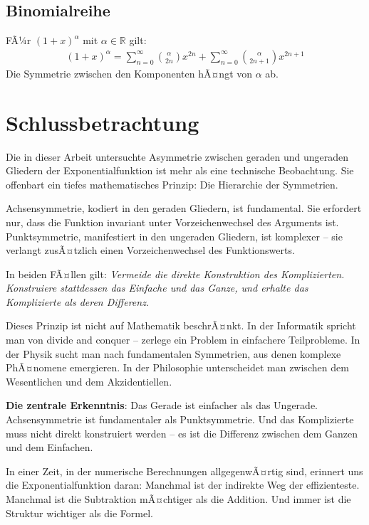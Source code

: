 ﻿\documentclass[a4paper,12pt]{article}
\theoremstyle{definition}
\begin{document}
\subsection{Binomialreihe}

FÃ¼r $(1+x)^\alpha$ mit $\alpha \in \mathbb{R}$ gilt:
\begin{align}
  (1+x)^\alpha
    = \sum_{n=0}^{\infty} \binom{\alpha}{2n} x^{2n}
    + \sum_{n=0}^{\infty} \binom{\alpha}{2n+1} x^{2n+1}
\end{align}
Die Symmetrie zwischen den Komponenten hÃ¤ngt von $\alpha$ ab.

\section{Schlussbetrachtung}

Die in dieser Arbeit untersuchte Asymmetrie zwischen geraden und ungeraden
Gliedern der Exponentialfunktion ist mehr als eine technische Beobachtung.
Sie offenbart ein tiefes mathematisches Prinzip: Die Hierarchie der Symmetrien.

Achsensymmetrie, kodiert in den geraden Gliedern, ist fundamental. Sie
erfordert nur, dass die Funktion invariant unter Vorzeichenwechsel des
Arguments ist. Punktsymmetrie, manifestiert in den ungeraden Gliedern, ist
komplexer -- sie verlangt zusÃ¤tzlich einen Vorzeichenwechsel des Funktionswerts.

In beiden FÃ¤llen gilt: \textit{Vermeide die direkte Konstruktion des
Komplizierten. Konstruiere stattdessen das Einfache und das Ganze, und erhalte
das Komplizierte als deren Differenz.}

Dieses Prinzip ist nicht auf Mathematik beschrÃ¤nkt. In der Informatik spricht
man von \glqq divide and conquer\grqq{} -- zerlege ein Problem in einfachere
Teilprobleme. In der Physik sucht man nach fundamentalen Symmetrien, aus denen
komplexe PhÃ¤nomene emergieren. In der Philosophie unterscheidet man zwischen
dem Wesentlichen und dem Akzidentiellen.

\textbf{Die zentrale Erkenntnis}: Das Gerade ist einfacher als das Ungerade.
Achsensymmetrie ist fundamentaler als Punktsymmetrie. Und das Komplizierte
muss nicht direkt konstruiert werden -- es ist die Differenz zwischen dem
Ganzen und dem Einfachen.

In einer Zeit, in der numerische Berechnungen allgegenwÃ¤rtig sind, erinnert
uns die Exponentialfunktion daran: Manchmal ist der indirekte Weg der
effizienteste. Manchmal ist die Subtraktion mÃ¤chtiger als die Addition. Und
immer ist die Struktur wichtiger als die Formel.
\end{document}
